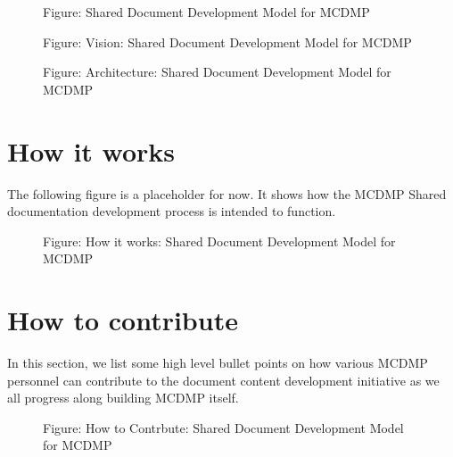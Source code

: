 \documentclass[letterpaper,10pt,english]{sphinxmanual}
\begin{document}
\begin{figure}[htbp]
\centering
\capstart

\noindent{}
\caption{Figure: Shared Document Development Model for MCDMP}\label{\detokenize{mcdmp_docx_res:id4}}\end{figure}

\begin{figure}[htbp]
\centering
\capstart

\noindent{}
\caption{Figure: Vision: Shared Document Development Model for MCDMP}\label{\detokenize{mcdmp_docx_res:id5}}\end{figure}

\begin{figure}[htbp]
\centering
\capstart

\noindent{}
\caption{Figure: Architecture: Shared Document Development Model for MCDMP}\label{\detokenize{mcdmp_docx_res:id6}}\end{figure}


\section{How it works}
\label{\detokenize{mcdmp_docx_res:how-it-works}}
The following figure is a placeholder for now.  It shows how the MCDMP Shared documentation development process is intended to function.

\begin{figure}[htbp]
\centering
\capstart

\noindent{}
\caption{Figure: How it works: Shared Document Development Model for MCDMP}\label{\detokenize{mcdmp_docx_res:id7}}\end{figure}


\section{How to contribute}
\label{\detokenize{mcdmp_docx_res:how-to-contribute}}
In this section, we list some high level bullet points on how various MCDMP personnel can contribute to the document content development initiative as we all progress along  building MCDMP itself.

\begin{figure}[htbp]
\centering
\capstart

\noindent{}
\caption{Figure: How to Contrbute: Shared Document Development Model for MCDMP}\label{\detokenize{mcdmp_docx_res:id8}}\end{figure}
\end{document}
